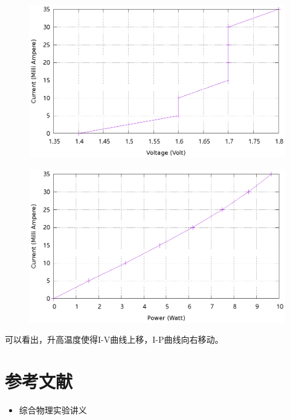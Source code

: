 \documentclass{ctexart}
\begin{document}
\begin{figure}[H]
  \centering
  \includegraphics[width=0.8\linewidth]{optics-figures/led-vc-8.gnuplot}
\end{figure}

\begin{figure}[H]
  \centering
  \includegraphics[width=0.8\linewidth]{optics-figures/led-pc-8.gnuplot}
\end{figure}

可以看出，升高温度使得I-V曲线上移，I-P曲线向右移动。

\newpage
\section{参考文献}
\begin{itemize}[leftmargin=0pt]
    \item[] 综合物理实验讲义
\end{itemize}
\end{document}
